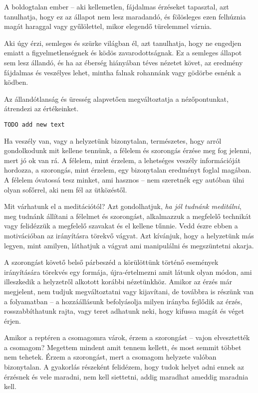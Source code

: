 A boldogtalan ember -- aki kellemetlen, fájdalmas érzéseket tapasztal,
azt tanulhatja, hogy ez az állapot nem lesz maradandó, és fölösleges
ezen felhúznia magát haraggal vagy gyűlölettel, mikor elegendő
türelemmel várnia.

Aki úgy érzi, semleges és szürke világban él, azt tanulhatja, hogy ne
engedjen emiatt a figyelmetlenségnek és ködös zavarodottságnak. Ez a
semleges állapot sem lesz állandó, és ha az éberség hiányában téves
nézetet követ, az eredmény fájdalmas és veszélyes lehet, mintha falnak
rohannánk vagy gödörbe esnénk a ködben.

Az állandótlanság és üresség alapvetően megváltoztatja a nézőpontunkat,
átrendezi az értékeinket.

\begin{verbatim}
TODO add new text
\end{verbatim}


Ha veszély van, vagy a helyzetünk bizonytalan, természetes, hogy arról
gondolkodunk mit kellene tennünk, a félelem és szorongás érzése meg fog
jelenni, mert jó ok van rá. A félelem, mint érzelem, a lehetséges
veszély információját hordozza, a szorongás, mint érzelem, egy
bizonytalan eredményt foglal magában. A félelem óvatossá tesz minket,
ami hasznos -- nem szeretnék egy autóban ülni olyan sofőrrel, aki nem
fél az ütközéstől.

Mit várhatunk el a meditációtól? Azt gondolhatjuk, \emph{ha jól tudnánk
meditálni}, meg tudnánk állítani a félelmet és szorongást, alkalmazzuk a
megfelelő technikát vagy felidézzük a megfelelő szavakat és el kellene
tűnnie. Vedd észre ebben a motivációban az irányításra törekvő vágyat.
Azt kívánjuk, hogy a helyzetünk más legyen, mint amilyen, láthatjuk a
vágyat ami manipulálni és megszüntetni akarja.

A szorongást követő belső párbeszéd a körülöttünk történő események
irányítására törekvés egy formája, újra-értelmezni amit látunk olyan
módon, ami illeszkedik a helyzetről alkotott korábbi nézetünkhöz. Amikor
az érzés már megjelent, nem tudjuk megváltoztatni vagy kijavítani, de
továbbra is részünk van a folyamatban -- a hozzáállásunk befolyásolja
milyen irányba fejlődik az érzés, rosszabbíthatunk rajta, vagy teret
adhatunk neki, hogy kifussa magát és véget érjen.

Amikor a reptéren a csomagomra várok, érzem a szorongást -- vajon
elvesztették a csomagom? Megettem mindent amit tennem kellett, és most
semmit többet nem tehetek. Érzem a szorongást, mert a csomagom helyzete
valóban bizonytalan. A gyakorlás részeként felidézem, hogy tudok helyet
adni ennek az érzésnek és vele maradni, nem kell siettetni, addig
maradhat ameddig maradnia kell.

